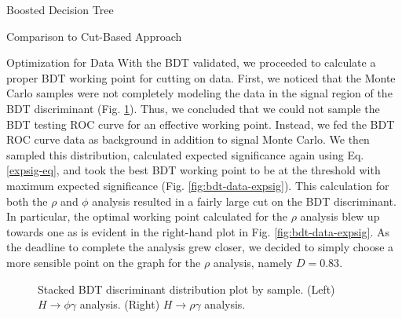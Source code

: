 \begin{section}{Boosted Decision Tree}
\begin{subsection}{Comparison to Cut-Based Approach}
\end{subsection}
\begin{subsection}{Optimization for Data}\label{optim-for-data}
With the BDT validated, we proceeded to calculate a proper BDT working point for cutting on data. First, we noticed that the Monte Carlo samples were not completely modeling the data in the signal region of the BDT discriminant (Fig. \ref{fig:bdt-thresh-dist}). Thus, we concluded that we could not sample the BDT testing ROC curve for an effective working point. Instead, we fed the BDT ROC curve data as background in addition to signal Monte Carlo. We then sampled this distribution, calculated expected significance again using Eq. \ref{expsig-eq}, and took the best BDT working point to be at the threshold with maximum expected significance (Fig. \ref{fig:bdt-data-expsig}). This calculation for both the $\rho$ and $\phi$ analysis resulted in a fairly large cut on the BDT discriminant. In particular, the optimal working point calculated for the $\rho$ analysis blew up towards one as is evident in the right-hand plot in Fig. \ref{fig:bdt-data-expsig}. As the deadline to complete the analysis grew closer, we decided to simply choose a more sensible point on the graph for the $\rho$ analysis, namely $D = 0.83$.

\begin{figure}[htb]
\begin{center}
\quad
{}
\end{center}
\caption{Stacked BDT discriminant distribution plot by sample. (Left) $H\rightarrow\phi\gamma$ analysis. (Right) $H\rightarrow\rho\gamma$ analysis.}
\label{fig:bdt-thresh-dist}
\end{figure}

\end{subsection}
\end{section}


